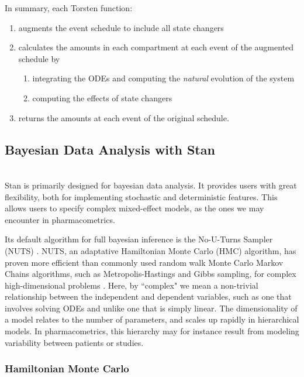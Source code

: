 \documentclass[11pt]{amsart}
\begin{document}
In summary, each Torsten function:
\begin{enumerate}
  \item augments the event schedule to include all state changers
  \item calculates the amounts in each compartment at each event of the augmented schedule by
  \begin{enumerate}
    \item integrating the ODEs and computing the \textit{natural} evolution of the system
    \item computing the effects of state changers
  \end{enumerate}
  \item returns the amounts at each event of the original schedule.
\end{enumerate}

\subsection{Bayesian Data Analysis with Stan} \ \\

Stan is primarily designed for bayesian data analysis. It provides users with great flexibility, both for implementing stochastic and deterministic features. This allows users to specify complex mixed-effect models, as the ones we may encounter in pharmacometrics.

Its default algorithm for full bayesian inference is the No-U-Turns Sampler (NUTS) \cite{nuts}. NUTS, an adaptative Hamiltonian Monte Carlo (HMC) \cite{HMC} algorithm, has proven more efficient than commonly used random walk Monte Carlo Markov Chains algorithms, such as Metropolis-Hastings and Gibbs sampling, for complex high-dimensional problems \cite{nuts}. Here, by ``complex" we mean a non-trivial relationship between the independent and dependent variables, such as one that involves solving ODEs and unlike one that is simply linear. The dimensionality of a model relates to the number of parameters, and scales up rapidly in hierarchical models. In pharmacometrics, this hierarchy may for instance result from modeling variability between patients or studies.

\subsubsection{Hamiltonian Monte Carlo} \ \\
\end{document}
